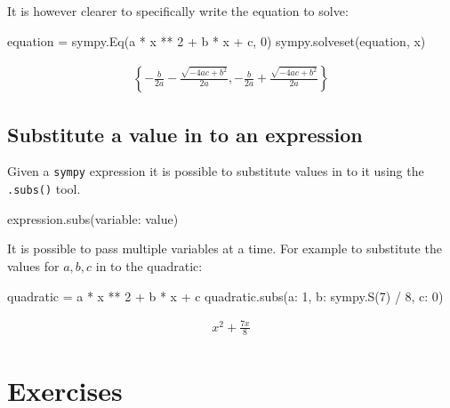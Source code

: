 \begin{pyin}
It is however clearer to specifically write the equation to solve:

\begin{pyin}
equation = sympy.Eq(a * x ** 2 + b * x + c, 0)
sympy.solveset(equation, x)
\end{pyin}




\begin{equation*}
\begin{split}\displaystyle \left\{- \frac{b}{2 a} - \frac{\sqrt{- 4 a c + b^{2}}}{2 a}, - \frac{b}{2 a} + \frac{\sqrt{- 4 a c + b^{2}}}{2 a}\right\}\end{split}
\end{equation*}




\subsection{Substitute a value in to an expression}

Given a \texttt{sympy} expression it is possible to substitute values in to it using
the \texttt{.subs()} tool.

\begin{pyin}
expression.subs({variable: value})
\end{pyin}

It is possible to pass multiple variables at a time.
For example to substitute the values for \(a, b, c\) in to the quadratic:

\begin{pyin}
quadratic = a * x ** 2 + b * x + c
quadratic.subs({a: 1, b: sympy.S(7) / 8, c: 0})
\end{pyin}

\begin{equation*}
\begin{split}\displaystyle x^{2} + \frac{7 x}{8}\end{split}
\end{equation*}

\section{Exercises}


\end{pyin}
